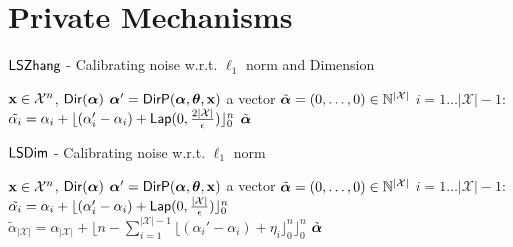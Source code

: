 \documentclass{article}
\begin{document}
\section{Private Mechanisms}
%
%
%
\begin{algorithm}
  \caption{$\mathsf{LSZhang}$\cite{zhang2016differential} - Calibrating noise w.r.t. $\ell_1$ norm and Dimension}
  \label{lapmech}
  \begin{algorithmic}
  \STATE $\textbf{x}\in\mathcal{X}^n$, $\mathsf{Dir}(\boldsymbol{\alpha})$
  \STATE {} $\boldsymbol{\alpha}' = \mathsf{DirP}(\boldsymbol{\alpha},\boldsymbol{\theta},\textbf{x})$
  \STATE {} a vector $\tilde{\boldsymbol{\alpha}} = (0, \dots, 0 )\in \mathbb{N}^{|\mathcal{X}|}$ 
  \STATE {} $i = 1 \dots |\mathcal{X}| - 1$:
  \STATE \quad {} $\tilde{\alpha_i}=\alpha_i + \lfloor{(\alpha_i' - \alpha_i)+ \mathsf{Lap}(0, \frac{2|\mathcal{X}|}{\epsilon}) }\rfloor^n_0$
   $\tilde{\boldsymbol{\alpha}}$
  \end{algorithmic}
\end{algorithm}
%
%
%
\begin{algorithm}
  \caption{$\mathsf{LSDim}$ - Calibrating noise w.r.t. $\ell_1$ norm}
  \label{lapmech}
  \begin{algorithmic}
  \STATE $\textbf{x}\in\mathcal{X}^n$, $\mathsf{Dir}(\boldsymbol{\alpha})$
  \STATE {} $\boldsymbol{\alpha}' = \mathsf{DirP}(\boldsymbol{\alpha},\boldsymbol{\theta},\textbf{x})$
  \STATE {} a vector $\tilde{\boldsymbol{\alpha}} = (0, \dots, 0 )\in \mathbb{N}^{|\mathcal{X}|}$ 
  \STATE {} $i = 1 \dots |\mathcal{X}| - 1$:
  \STATE \quad \quad  $\tilde{\alpha_i}=\alpha_i + \lfloor{(\alpha_i' - \alpha_i) + \mathsf{Lap}(0, \frac{|\mathcal{X}|}{\epsilon})}\rfloor^n_0$ 
  \STATE \quad $\tilde{\alpha}_{|\mathcal{X}|} = \alpha_{|\mathcal{X}|} + \lfloor n - \sum_{i = 1}^{|\mathcal{X}|-1}\lfloor{(\alpha_i' - \alpha_i) + \eta_i}\rfloor^n_0 \rfloor^n_0$
   $\tilde{\boldsymbol{\alpha}}$
  \end{algorithmic}
\end{algorithm}
%
%
%
%
%
%
\end{document}
